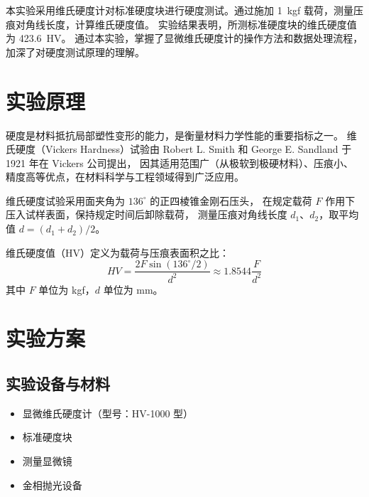 
\begin{reportabstract}
    本实验采用维氏硬度计对标准硬度块进行硬度测试。通过施加 1~kgf 载荷，测量压痕对角线长度，计算维氏硬度值。
    实验结果表明，所测标准硬度块的维氏硬度值为 423.6~HV。
    通过本实验，掌握了显微维氏硬度计的操作方法和数据处理流程，加深了对硬度测试原理的理解。
\end{reportabstract}


\section{实验原理}

硬度是材料抵抗局部塑性变形的能力，是衡量材料力学性能的重要指标之一。
维氏硬度（Vickers Hardness）试验由 Robert L. Smith 和 George E. Sandland 于 1921 年在 Vickers 公司提出，
因其适用范围广（从极软到极硬材料）、压痕小、精度高等优点，在材料科学与工程领域得到广泛应用。

维氏硬度试验采用面夹角为 $136^{\circ}$ 的正四棱锥金刚石压头，
在规定载荷 $F$ 作用下压入试样表面，保持规定时间后卸除载荷，
测量压痕对角线长度 $d_1$、$d_2$，取平均值 $d = (d_1 + d_2)/2$。

维氏硬度值（HV）定义为载荷与压痕表面积之比：
\begin{equation}
    HV = \frac{2F \sin(136^{\circ}/2)}{d^2} \approx 1.8544 \frac{F}{d^2}
\end{equation}
其中 $F$ 单位为 kgf，$d$ 单位为 mm。


\section{实验方案}

\subsection{实验设备与材料}

\begin{itemize}
    \item 显微维氏硬度计（型号：HV-1000 型）
    \item 标准硬度块
    \item 测量显微镜
    \item 金相抛光设备
\end{itemize}

